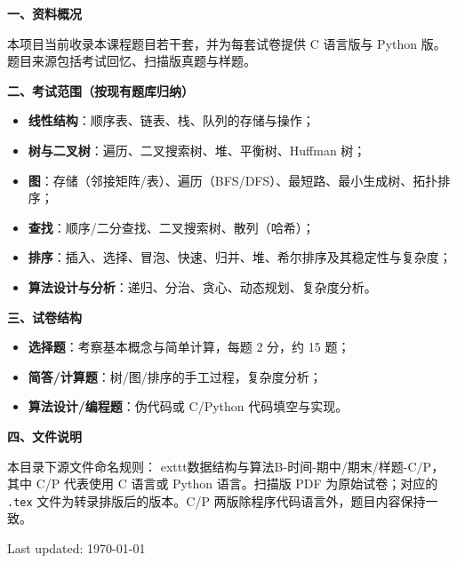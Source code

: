 
\textbf{一、资料概况}

本项目当前收录本课程题目若干套，并为每套试卷提供 C 语言版与 Python 版。题目来源包括考试回忆、扫描版真题与样题。

\textbf{二、考试范围（按现有题库归纳）}
\begin{itemize}[leftmargin=2em,itemsep=0.2em,topsep=0.2em]
  \item \textbf{线性结构}：顺序表、链表、栈、队列的存储与操作；
  \item \textbf{树与二叉树}：遍历、二叉搜索树、堆、平衡树、Huffman 树；
  \item \textbf{图}：存储（邻接矩阵/表）、遍历（BFS/DFS）、最短路、最小生成树、拓扑排序；
  \item \textbf{查找}：顺序/二分查找、二叉搜索树、散列（哈希）；
  \item \textbf{排序}：插入、选择、冒泡、快速、归并、堆、希尔排序及其稳定性与复杂度；
  \item \textbf{算法设计与分析}：递归、分治、贪心、动态规划、复杂度分析。
\end{itemize}

\textbf{三、试卷结构}
\begin{itemize}[leftmargin=2em,itemsep=0.2em,topsep=0.2em]
  \item \textbf{选择题}：考察基本概念与简单计算，每题 2 分，约 15 题；
  \item \textbf{简答/计算题}：树/图/排序的手工过程，复杂度分析；
  \item \textbf{算法设计/编程题}：伪代码或 C/Python 代码填空与实现。
\end{itemize}

\textbf{四、文件说明}

本目录下源文件命名规则：	exttt{数据结构与算法B-时间-期中/期末/样题-C/P}，其中 C/P 代表使用 C 语言或 Python 语言。扫描版 PDF 为原始试卷；对应的 \texttt{.tex} 文件为转录排版后的版本。C/P 两版除程序代码语言外，题目内容保持一致。

\vfill
\hfill Last updated: \today
